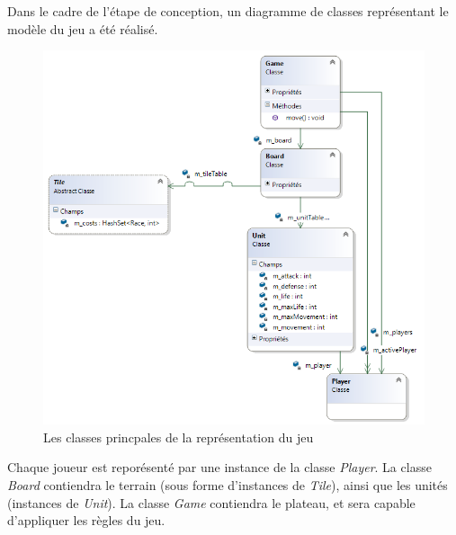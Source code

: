 Dans le cadre de l'étape de conception, un diagramme de classes représentant le modèle du jeu a été réalisé.

\begin{figure}[!h]
\centering
\includegraphics[width=\textwidth]{Parties/Images/UML_Princ.png}
\caption{Les classes princpales de la représentation du jeu}
\label{fig:uml_princ}
\end{figure}

Chaque joueur est reporésenté par une instance de la classe \emph{Player}.
La classe \emph{Board} contiendra le terrain (sous forme d'instances de \emph{Tile}), ainsi que les unités (instances de \emph{Unit}).
La classe \emph{Game} contiendra le plateau, et sera capable d'appliquer les règles du jeu.